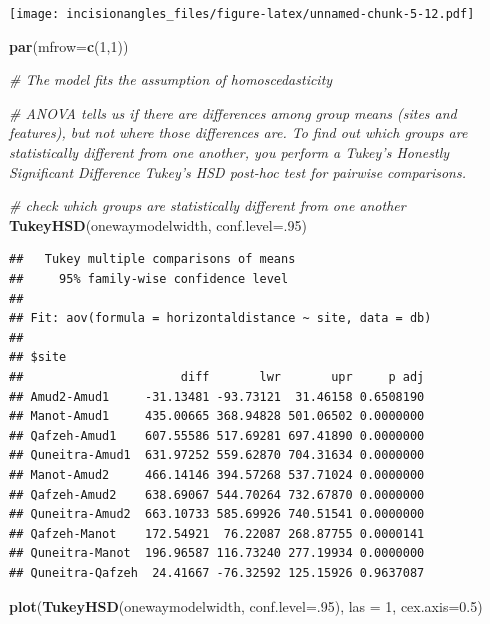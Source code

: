 \documentclass[
]{article}
\newenvironment{Shaded}{\begin{snugshade}}{\end{snugshade}}
\newcommand{\AttributeTok}[1]{\textcolor[rgb]{0.13,0.29,0.53}{#1}}
\newcommand{\CommentTok}[1]{\textcolor[rgb]{0.56,0.35,0.01}{\textit{#1}}}
\newcommand{\DecValTok}[1]{\textcolor[rgb]{0.00,0.00,0.81}{#1}}
\newcommand{\FloatTok}[1]{\textcolor[rgb]{0.00,0.00,0.81}{#1}}
\newcommand{\FunctionTok}[1]{\textcolor[rgb]{0.13,0.29,0.53}{\textbf{#1}}}
\newcommand{\NormalTok}[1]{#1}
\begin{document}
\texttt{[image: incisionangles\_files/figure-latex/unnamed-chunk-5-12.pdf]}

\begin{Shaded}
\begin{Highlighting}[]
\FunctionTok{par}\NormalTok{(}\AttributeTok{mfrow=}\FunctionTok{c}\NormalTok{(}\DecValTok{1}\NormalTok{,}\DecValTok{1}\NormalTok{))}

\CommentTok{\# The model fits the assumption of homoscedasticity}

\CommentTok{\# ANOVA tells us if there are differences among group means (sites and features), but not where those differences are. To find out which groups are statistically different from one another, you perform a Tukey’s Honestly Significant Difference Tukey’s HSD post{-}hoc test for pairwise comparisons.}

\CommentTok{\# check which groups are statistically different from one another}
\FunctionTok{TukeyHSD}\NormalTok{(onewaymodelwidth, }\AttributeTok{conf.level=}\NormalTok{.}\DecValTok{95}\NormalTok{) }
\end{Highlighting}
\end{Shaded}

\begin{verbatim}
##   Tukey multiple comparisons of means
##     95% family-wise confidence level
## 
## Fit: aov(formula = horizontaldistance ~ site, data = db)
## 
## $site
##                      diff       lwr       upr     p adj
## Amud2-Amud1     -31.13481 -93.73121  31.46158 0.6508190
## Manot-Amud1     435.00665 368.94828 501.06502 0.0000000
## Qafzeh-Amud1    607.55586 517.69281 697.41890 0.0000000
## Quneitra-Amud1  631.97252 559.62870 704.31634 0.0000000
## Manot-Amud2     466.14146 394.57268 537.71024 0.0000000
## Qafzeh-Amud2    638.69067 544.70264 732.67870 0.0000000
## Quneitra-Amud2  663.10733 585.69926 740.51541 0.0000000
## Qafzeh-Manot    172.54921  76.22087 268.87755 0.0000141
## Quneitra-Manot  196.96587 116.73240 277.19934 0.0000000
## Quneitra-Qafzeh  24.41667 -76.32592 125.15926 0.9637087
\end{verbatim}

\begin{Shaded}
\begin{Highlighting}[]
\FunctionTok{plot}\NormalTok{(}\FunctionTok{TukeyHSD}\NormalTok{(onewaymodelwidth, }\AttributeTok{conf.level=}\NormalTok{.}\DecValTok{95}\NormalTok{), }\AttributeTok{las =} \DecValTok{1}\NormalTok{, }\AttributeTok{cex.axis=}\FloatTok{0.5}\NormalTok{)}
\end{Highlighting}
\end{Shaded}
\end{document}
